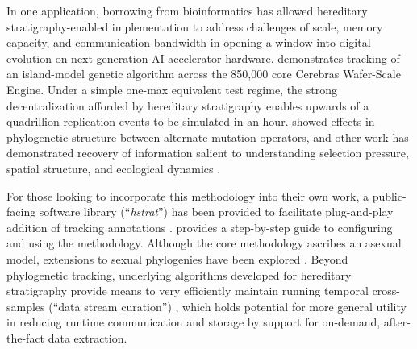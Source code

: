 In one application, borrowing from bioinformatics has allowed hereditary stratigraphy-enabled implementation to address challenges of scale, memory capacity, and communication bandwidth in opening a window into digital evolution on next-generation AI accelerator hardware.
\citet{moreno2024trackable} demonstrates tracking of an island-model genetic algorithm across the 850,000 core Cerebras Wafer-Scale Engine.
Under a simple one-max equivalent test regime, the strong decentralization afforded by hereditary stratigraphy enables upwards of a quadrillion replication events to be simulated in an hour.
\citet{moreno2024trackable} showed effects in phylogenetic structure between alternate mutation operators, and other work has demonstrated recovery of information salient to understanding selection pressure, spatial structure, and ecological dynamics \citep{moreno2024ecology}.

For those looking to incorporate this methodology into their own work, a public-facing software library (``\textit{hstrat}'') has been provided to facilitate plug-and-play addition of tracking annotations  \citep{moreno2022hstrat}.
\citet{moreno2024guide} provides a step-by-step guide to configuring and using the methodology.
Although the core methodology ascribes an asexual model, extensions to sexual phylogenies have been explored \citep{moreno2024methods}.
Beyond phylogenetic tracking, underlying algorithms developed for hereditary stratigraphy provide means to very efficiently maintain running temporal cross-samples (``data stream curation'') \citep{moreno2024structured}, which holds potential for more general utility in reducing runtime communication and storage by support for on-demand, after-the-fact data extraction.
